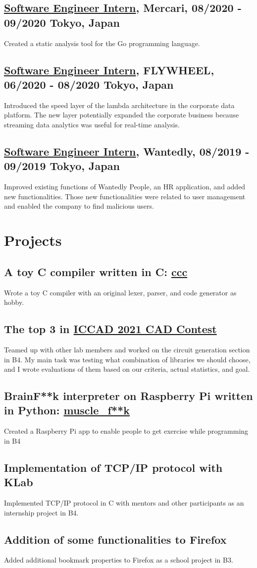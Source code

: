 \documentclass[10pt]{article}
\begin{document}
  \subsection*{\underline{Software Engineer Intern}, Mercari, 08/2020 - 09/2020 \hfill Tokyo, Japan}
    Created a static analysis tool for the Go programming language.
  \subsection*{\underline{Software Engineer Intern}, FLYWHEEL, 06/2020 - 08/2020 \hfill Tokyo, Japan}
    Introduced the speed layer of the lambda architecture in the corporate data platform.
    The new layer potentially expanded the corporate business because streaming data analytics was useful for real-time analysis.
  \subsection*{\underline{Software Engineer Intern}, Wantedly, 08/2019 - 09/2019 \hfill Tokyo, Japan}
    Improved existing functions of Wantedly People, an HR application, and added new functionalities.
    Those new functionalities were related to user management and enabled the company to find malicious users.

\section*{Projects}
  \subsection*{A toy C compiler written in C: \href{https://github.com/diohabara/ccc}{ccc}}
    Wrote a toy C compiler with an original lexer, parser, and code generator as hobby.
  \subsection*{The top 3 in \href{http://iccad-contest.org/2021/}{ICCAD 2021 CAD Contest}}
    Teamed up with other lab members and worked on the circuit generation section in B4.
    My main task was testing what combination of libraries we should choose, and I wrote evaluations of them based on our criteria, actual statistics, and goal.
  \subsection*{BrainF**k interpreter on Raspberry Pi written in Python: \href{https://github.com/diohabara/muscle_fuck}{muscle\_f**k}}
    Created a Raspberry Pi app to enable people to get exercise while programming in B4
  \subsection*{Implementation of TCP/IP protocol with KLab}
    Implemented TCP/IP protocol in C with mentors and other participants as an internship project in B4.
  \subsection*{Addition of some functionalities to Firefox}
    Added additional bookmark properties to Firefox as a school project in B3.
\end{document}
